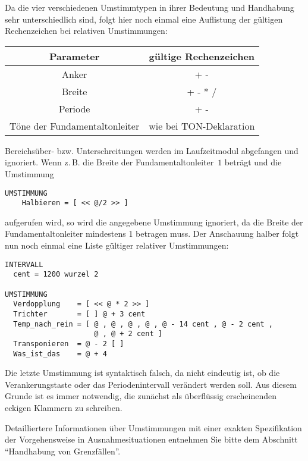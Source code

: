 Da die vier verschiedenen Umstimmtypen in ihrer Bedeutung und
Handhabung sehr unterschiedlich sind, folgt hier noch einmal eine
Auflistung der gültigen Rechenzeichen bei relativen Umstimmungen:

\begin{center}
\begin{tabular}{|c|c|}
\hline
Parameter    &  gültige Rechenzeichen \\ \hline
Anker        &  +   -                 \\
Breite       &  +   -   *   /         \\
Periode      &  +   -                 \\
Töne der Fundamentaltonleiter  &  wie bei TON-Deklaration   \\ \hline
\end{tabular}
\end{center}

\vspace{3 mm}
Bereichsüber- bzw. Unterschreitungen werden im Laufzeitmodul
abgefangen und ignoriert. Wenn z.\,B. die Breite der Fundamentaltonleiter~$1$ beträgt
und die Umstimmung
\begin{verbatim}
UMSTIMMUNG
    Halbieren = [ << @/2 >> ]
\end{verbatim}
aufgerufen wird, so wird die angegebene Umstimmung ignoriert, da die
Breite der Fundamentaltonleiter mindestens 1 betragen muss. Der Anschauung halber folgt
nun noch einmal eine Liste gültiger relativer Umstimmungen:

\begin{verbatim}
INTERVALL
  cent = 1200 wurzel 2

UMSTIMMUNG
  Verdopplung    = [ << @ * 2 >> ]
  Trichter       = [ ] @ + 3 cent
  Temp_nach_rein = [ @ , @ , @ , @ , @ - 14 cent , @ - 2 cent ,
                     @ , @ + 2 cent ]
  Transponieren  = @ - 2 [ ]
  Was_ist_das    = @ + 4
\end{verbatim}
Die letzte Umstimmung ist syntaktisch falsch, da nicht eindeutig ist,
ob die Verankerungstaste oder das Periodenintervall verändert werden
soll. Aus diesem Grunde ist es immer notwendig, die zunächst als
überflüssig erscheinenden eckigen Klammern zu schreiben.

Detailliertere Informationen über Umstimmungen mit einer exakten
Spezifikation der Vorgehensweise in Ausnahmesituationen entnehmen Sie
bitte dem Abschnitt "`Handhabung von Grenzfällen"'.

